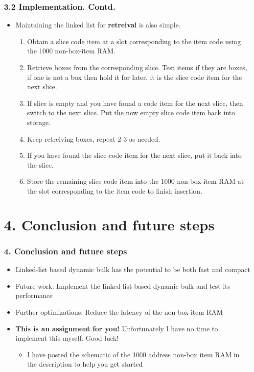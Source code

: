 \documentclass[aspectratio=169]{beamer}
\begin{document}
\begin{frame}
	\frametitle{3.2 Implementation. Contd.}

    \begin{itemize}
        \item Maintaining the linked list for \textbf{retreival} is also simple.
        \begin{enumerate}
            \item Obtain a slice code item at a slot corresponding to the item code using the 1000 non-box-item RAM.
            \item Retrieve boxes from the corresponding slice. Test items if they are boxes, if one is not a box then hold it for later, it is the slice code item for the next slice.
            \item If slice is empty and you have found a code item for the next slice, then switch to the next slice. Put the now empty slice code item back into storage.
            \item Keep retreiving boxes, repeat 2-3 as needed.
            \item If you have found the slice code item for the next slice, put it back into the slice.
            \item Store the remaining slice code item into the 1000 non-box-item RAM at the slot corresponding to the item code to finish insertion.
        \end{enumerate}
    \end{itemize}
\end{frame}

\section{4. Conclusion and future steps}

\begin{frame}
    \frametitle{4. Conclusion and future steps}

    \begin{itemize}
        \item Linked-list based dynamic bulk has the potential to be both fast and compact
        \item Future work: Implement the linked-list based dynamic bulk and test its performance
        \item Further optimizations: Reduce the latency of the non-box item RAM
        \item \textbf{This is an assignment for you!} Unfortunately I have no time to implement this myself. Good luck!
        \begin{itemize}
            \item I have posted the schematic of the 1000 address non-box item RAM in the description to help you get started
        \end{itemize}
    \end{itemize}
\end{frame}
\end{document}
